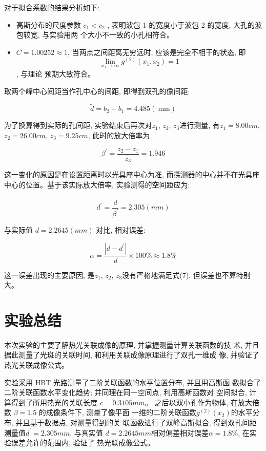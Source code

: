\documentclass[12pt,a4paper]{article}
\newcommand{\be}[1]{
    \begin{equation}
        #1
    \end{equation}
}
\begin{document}
对于拟合系数的结果分析如下:
\begin{itemize}
\item 高斯分布的尺度参数 $c_1 < c_2$ , 表明波包 1 的宽度小于波包 2 的宽度, 大孔的波包较宽, 与实验用两
个大小不一致的小孔相符合。
\item $C = 1.00252 \approx 1$, 当两点之间距离无穷远时, 应该是完全不相干的状态, 即 $$\lim _{x_{1} \rightarrow \infty} g^{(2)}\left(x_{1}, x_{2}\right)=1$$, 与理论
预期大致符合。
\end{itemize}
取两个峰中心间距当作孔中心的间距, 即得到双孔的像间距:
\be{\tilde{d}=b_{2}-b_{1}=4.485(\mathrm{~mm})}
为了换算得到实际的孔间距, 实验结束后再次对$z_1$, $z_2$, $z_3$进行测量, 有$z_1=8.00cm$, $z_2=26.00cm$, $z_3=9.25cm$, 
此时的放大倍率为
\be{\beta^{\prime}=\frac{z_2-z_1}{z_3}=1.946}
这一变化的原因是在设置距离时以光具座中心为准, 而探测器的中心并不在光具座中心的位置。基于该实际放大倍率, 实验测得的空间距应为: 
\be{d^{\prime}=\frac{\tilde{d}}{\beta^{\prime}}=2.305(mm)}
与实际值 $d = 2.2645(mm)$ 对比, 相对误差:
\be{\alpha=\frac{|d-d^{\prime}|}{d} \times 100 \% \approx 1.8 \%}
这一误差出现的主要原因, 是$z_1$, $z_2$, $z_3$没有严格地满足式(7), 但误差也不算特别大。
\section{实验总结}
本次实验的主要了解热光关联成像的原理, 并掌握测量计算关联函数的技
术, 并且据此测量了光斑的关联时间, 和利用关联成像原理进行了双孔一维成
像, 并验证了热光关联成像公式。

实验采用 HBT 光路测量了二阶关联函数的水平位置分布, 并且用高斯函
数拟合了二阶关联函数水平变化趋势; 并同理在同一空间点, 利用高斯函数对
空间拟合, 计算得到了所用热光的关联长度 $c = 0.3105 mm$。
之后以双小孔作为物体, 在放大倍数 $\beta = 1.5$ 的成像条件下, 测量了像平面
一维的二阶关联函数$ g^{(2)}(x_2) $的水平分布, 并且基于数据点, 对测量得到的关
联函数进行了双峰高斯拟合, 得到双孔间距测量值$ d^{\prime} = 2.305mm$, 与真实值
$d = 2.2645mm $相对偏差相对误差$ \alpha = 1.8\%$, 
在实验误差允许的范围内, 验证了
热光联成像公式。
\end{document}
